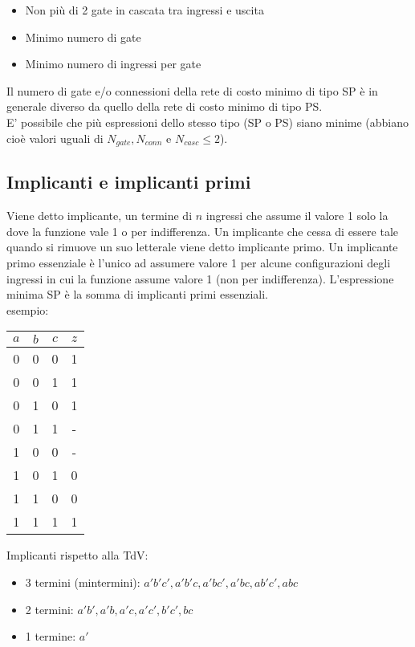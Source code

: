 \documentclass{subfiles}
\begin{document}
\begin{itemize}
    \item Non più di 2 gate in cascata tra ingressi e uscita
    \item Minimo numero di gate
    \item Minimo numero di ingressi per gate
\end{itemize}

\noindent
Il numero di gate e/o connessioni della rete di costo minimo di tipo SP è in generale diverso da quello della rete di costo minimo di tipo PS.\\

\noindent
E' possibile che più espressioni dello stesso tipo (SP o PS) siano minime (abbiano cioè valori uguali di $N_{gate}, N_{conn}$ e $N_{casc} \leq 2$).

\subsection{Implicanti e implicanti primi}

Viene detto implicante, un termine di $n$ ingressi che assume il valore 1 solo la dove la funzione vale 1 o per indifferenza.
Un implicante che cessa di essere tale quando si rimuove un suo letterale viene detto implicante primo.
Un implicante primo essenziale è l'unico ad assumere valore 1 per alcune configurazioni degli ingressi in cui la funzione assume valore 1 (non per indifferenza).
L'espressione minima SP è la somma di implicanti primi essenziali.\\

\noindent
esempio:

\begin{center}
\begin{tabular}{ |c|c|c|c| }
\hline
$a$ & $b$ & $c$ & $z$ \\
\hline
\hline
0 & 0 & 0 & 1 \\
0 & 0 & 1 & 1 \\
0 & 1 & 0 & 1 \\
0 & 1 & 1 & - \\
1 & 0 & 0 & - \\
1 & 0 & 1 & 0 \\
1 & 1 & 0 & 0 \\
1 & 1 & 1 & 1 \\
\hline
\end{tabular}
\end{center}

\noindent
Implicanti rispetto alla TdV:

\begin{itemize}
    \item 3 termini (mintermini): $a'b'c', a'b'c, a'bc', a'bc, ab'c', abc$
    \item 2 termini: $a'b', a'b, a'c, a'c', b'c', bc$
    \item 1 termine: $a'$
\end{itemize}
\end{document}
